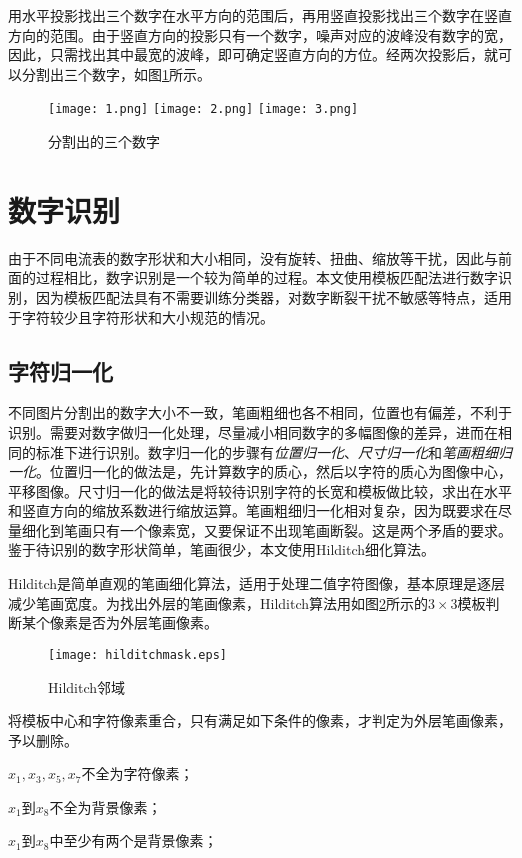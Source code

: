 用水平投影找出三个数字在水平方向的范围后，再用竖直投影找出三个数字在竖直方向的范围。由于竖直方向的投影只有一个数字，噪声对应的波峰没有数字的宽，因此，只需找出其中最宽的波峰，即可确定竖直方向的方位。经两次投影后，就可以分割出三个数字，如图\ref{fig:digit}所示。
\begin{figure}[h]
  \centering
  \texttt{[image: 1.png]}\hspace{1cm}
  \texttt{[image: 2.png]}\hspace{1cm}
  \texttt{[image: 3.png]}
  \caption{分割出的三个数字}
  \label{fig:digit}
\end{figure}

\section{数字识别}

由于不同电流表的数字形状和大小相同，没有旋转、扭曲、缩放等干扰，因此与前面的过程相比，数字识别是一个较为简单的过程。本文使用模板匹配法进行数字识别，因为模板匹配法具有不需要训练分类器，对数字断裂干扰不敏感等特点，适用于字符较少且字符形状和大小规范的情况。

\subsection{字符归一化}\label{sec:norm}

不同图片分割出的数字大小不一致，笔画粗细也各不相同，位置也有偏差，不利于识别。需要对数字做归一化处理，尽量减小相同数字的多幅图像的差异，进而在相同的标准下进行识别。数字归一化的步骤有\emph{位置归一化}、\emph{尺寸归一化}和\emph{笔画粗细归一化}。位置归一化的做法是，先计算数字的质心，然后以字符的质心为图像中心，平移图像。尺寸归一化的做法是将较待识别字符的长宽和模板做比较，求出在水平和竖直方向的缩放系数进行缩放运算。笔画粗细归一化相对复杂，因为既要求在尽量细化到笔画只有一个像素宽，又要保证不出现笔画断裂。这是两个矛盾的要求。鉴于待识别的数字形状简单，笔画很少，本文使用Hilditch细化算法。

Hilditch是简单直观的笔画细化算法，适用于处理二值字符图像，基本原理是逐层减少笔画宽度。为找出外层的笔画像素，Hilditch算法用如图\ref{fig:hilditchmask}所示的$3\times 3$模板判断某个像素是否为外层笔画像素。
\begin{figure}[h]
  \centering
  \texttt{[image: hilditchmask.eps]}
  \caption{Hilditch邻域}
  \label{fig:hilditchmask}
\end{figure}
将模板中心和字符像素重合，只有满足如下条件的像素，才判定为外层笔画像素，予以删除。
\begin{asparaenum}[(1)]

\item $x_1,x_3,x_5,x_7$不全为字符像素；
\item $x_1$到$x_8$不全为背景像素；
\item $x_1$到$x_8$中至少有两个是背景像素；
\end{asparaenum}

